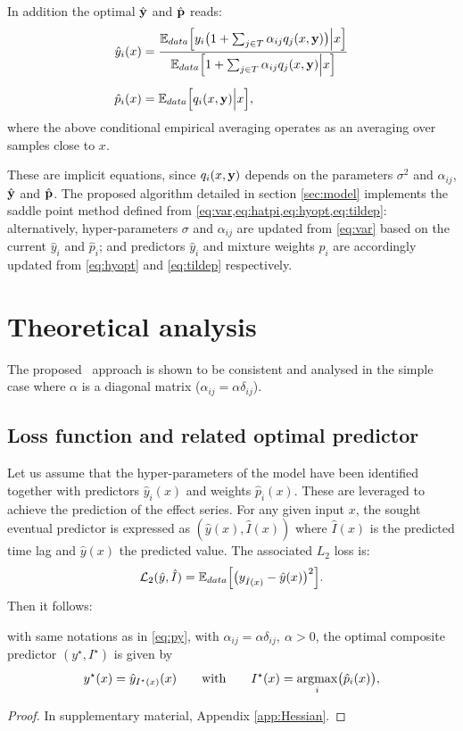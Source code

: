 %
In addition the optimal $\hat {\bf y}$ and $\hat{\bf p}$ reads:
%
\begin{align}
  \hat y_i(x) &= 
    \frac{
      {\mathbb E}_{data} \Bigl[
          y_i\bigl(1+\sum_{j\in T}\alpha_{ij}q_j(x,{\bf y})\bigr)\Big\vert x
        \Bigr]
    }{
      {\mathbb E}_{data}\Bigl[1+\sum_{j\in T}\alpha_{ij}q_j(x,{\bf y})\Big\vert x\Bigr]
    }\label{eq:hyopt}\\[0.2cm]
  \hat p_i(x) &= {\mathbb E}_{data}\Bigl[q_i(x,{\bf y})\Big\vert x \Bigr],\label{eq:tildep}
\end{align}
%
where the above conditional empirical averaging operates as an averaging over samples close to $x$.

These are implicit equations, since $q_i(x,{\bf y})$ depends on the parameters $\sigma^2$ and 
$\alpha_{ij}$, $\hat {\bf y}$ and $\hat{\bf p}$. The proposed algorithm detailed in section \ref{sec:model} 
implements the saddle point method defined from \cref{eq:var,eq:hatpi,eq:hyopt,eq:tildep}: 
alternatively, hyper-parameters $\sigma$ and $\alpha_{ij}$ are updated from \cref{eq:var} based on 
the current $\hat y_i$ and $\hat p_i$; and predictors $\hat y_i$ and mixture weights $\hat p_i$ are 
accordingly updated from \cref{eq:hyopt} and \cref{eq:tildep} respectively. 

\section{Theoretical analysis}\label{sec:dtlrtheory}
The proposed \XX\ approach is shown to be consistent and analysed in the simple case where $\alpha$ 
is a diagonal matrix ($\alpha_{ij} = \alpha\delta_{ij}$).

\subsection{Loss function and related optimal predictor}\label{sec:prop}
Let us assume that the hyper-parameters of the model have been identified together with predictors 
$\hat y_i(x)$ and weights $\hat p_i(x)$. These are leveraged to achieve the prediction of the 
effect series. For any given input $x$, the sought eventual predictor is expressed as 
$(\hat y(x),\hat I(x))$ where $\hat I(x)$ is the predicted time lag and $\hat y(x)$ the predicted 
value. The associated $L_2$ loss is: 
%
\begin{equation}\label{eq:orloss}
  {\cal L}_2(\hat y,\hat I) = {\mathbb E}_{data}\Bigl[\bigl(y_{\hat I(x)}-\hat y(x)\bigr)^2\Bigr]. 
\end{equation}
%
Then it follows:
%
\begin{prop}\label{prop:opred}
with same notations as in \cref{eq:py}, with $\alpha_{ij} = \alpha\delta_{ij},\ \alpha>0$, 
the optimal composite predictor $(y^\star,I^\star)$ is given by
\[
  y^\star(x) = 
    \hat y_{I^\star(x)}(x)\qquad\text{with}\qquad I^\star(x) = \operatorname*{argmax}_{i} \bigl(\hat p_i(x)\bigr), 
\]
\end{prop}
%
\begin{proof}
In supplementary material, Appendix \ref{app:Hessian}.
\end{proof}

